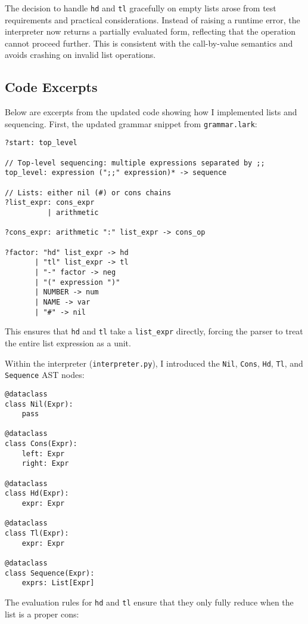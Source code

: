 \documentclass{article}
\theoremstyle{theorem}
\theoremstyle{definition}
\theoremstyle{remark}
\begin{document}
The decision to handle \texttt{hd} and \texttt{tl} gracefully on empty lists arose from test requirements and practical considerations. Instead of raising a runtime error, the interpreter now returns a partially evaluated form, reflecting that the operation cannot proceed further. This is consistent with the call-by-value semantics and avoids crashing on invalid list operations.

\subsection{Code Excerpts}

Below are excerpts from the updated code showing how I implemented lists and sequencing. First, the updated grammar snippet from \texttt{grammar.lark}:

\begin{verbatim}
?start: top_level

// Top-level sequencing: multiple expressions separated by ;;
top_level: expression (";;" expression)* -> sequence

// Lists: either nil (#) or cons chains
?list_expr: cons_expr
          | arithmetic

?cons_expr: arithmetic ":" list_expr -> cons_op

?factor: "hd" list_expr -> hd
       | "tl" list_expr -> tl
       | "-" factor -> neg
       | "(" expression ")"
       | NUMBER -> num
       | NAME -> var
       | "#" -> nil
\end{verbatim}

This ensures that \texttt{hd} and \texttt{tl} take a \texttt{list\_expr} directly, forcing the parser to treat the entire list expression as a unit.

Within the interpreter (\texttt{interpreter.py}), I introduced the \texttt{Nil}, \texttt{Cons}, \texttt{Hd}, \texttt{Tl}, and \texttt{Sequence} AST nodes:

\begin{verbatim}
@dataclass
class Nil(Expr):
    pass

@dataclass
class Cons(Expr):
    left: Expr
    right: Expr

@dataclass
class Hd(Expr):
    expr: Expr

@dataclass
class Tl(Expr):
    expr: Expr

@dataclass
class Sequence(Expr):
    exprs: List[Expr]
\end{verbatim}

The evaluation rules for \texttt{hd} and \texttt{tl} ensure that they only fully reduce when the list is a proper cons:
\end{document}
